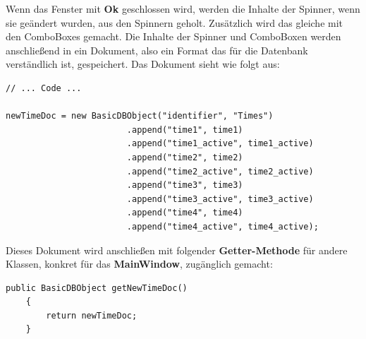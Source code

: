 Wenn das Fenster mit \textbf{Ok} geschlossen wird, werden die Inhalte der Spinner, wenn sie geändert wurden, aus den Spinnern geholt. Zusätzlich wird das gleiche mit den ComboBoxes gemacht. Die Inhalte der Spinner und ComboBoxen werden anschließend in ein Dokument, also ein Format das für die Datenbank verständlich ist, gespeichert. Das Dokument sieht wie folgt aus:

\newpage

\begin{lstlisting}[style=Javastyle, caption=Zeitendokument]
// ... Code ...

newTimeDoc = new BasicDBObject("identifier", "Times")
                        .append("time1", time1)
                        .append("time1_active", time1_active)
                        .append("time2", time2)
                        .append("time2_active", time2_active)
                        .append("time3", time3)
                        .append("time3_active", time3_active)
                        .append("time4", time4)
                        .append("time4_active", time4_active);
\end{lstlisting}
Dieses Dokument wird anschließen mit folgender \textbf{Getter-Methode} für andere Klassen, konkret für das \textbf{MainWindow}, zugänglich gemacht:
\begin{lstlisting}[style=Javastyle, caption=Zeitendokument Getter-Methode]
public BasicDBObject getNewTimeDoc()
    {
        return newTimeDoc;
    }
\end{lstlisting}

\newpage

